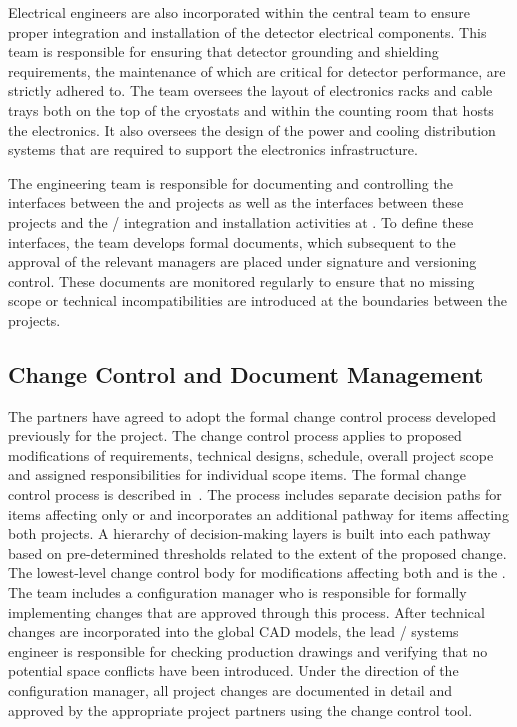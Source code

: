 Electrical engineers are also incorporated within the central
 team to ensure proper integration and installation of the
detector electrical components.  This team is responsible for ensuring
that detector grounding and shielding requirements, the maintenance of
which are critical for detector performance, are strictly adhered to.
The team oversees the layout of electronics racks and cable trays both
on the top of the cryostats and within the  counting room
that hosts the  electronics.  It also oversees the design of the
power and cooling distribution systems that are required to support
the electronics infrastructure.

The  engineering team is responsible for documenting and
controlling the interfaces between the  and  projects as well
as the interfaces between these projects and the / integration
and installation activities at .  To define these interfaces, the
 team develops formal documents, which subsequent to the approval
of the relevant managers are placed under signature and versioning
control.  These documents are monitored regularly to ensure that no
missing scope or technical incompatibilities are introduced at the
boundaries between the projects.


\subsection{Change Control and Document Management}
\label{sec:dune_changecontrol}

The  partners have agreed to adopt the formal change
control process developed previously for the  project.
The change control process applies to proposed modifications of
requirements, technical designs, schedule, overall project scope and
assigned responsibilities for individual scope items.  The formal
 change control process is described in~. 
The process includes separate decision paths for items affecting only
 or  and incorporates an additional pathway
for items affecting both projects.  A hierarchy of decision-making
layers is built into each pathway based on pre-determined thresholds
related to the extent of the proposed change.  The lowest-level change
control body for modifications affecting both  and
 is the .  The  team includes a
configuration manager who is responsible for formally implementing
changes that are approved through this process.  After technical
changes are incorporated into the global \threed CAD models, the lead
/ systems engineer is responsible for checking production
drawings and verifying that no potential space conflicts have been
introduced.  Under the direction of the configuration manager, all
project changes are documented in detail and approved %
by the
appropriate project partners using the  change control tool.

